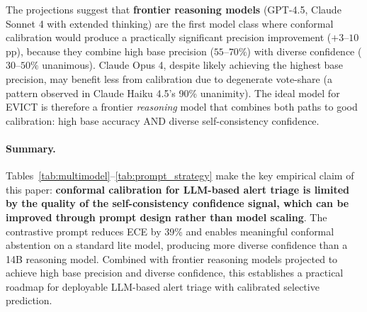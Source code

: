 The projections suggest that \textbf{frontier reasoning models} (GPT-4.5, Claude Sonnet 4 with extended thinking) are the first model class where conformal calibration would produce a practically significant precision improvement ($+3$--$10$pp), because they combine high base precision ($55$--$70\%$) with diverse confidence ($30$--$50\%$ unanimous). Claude Opus 4, despite likely achieving the highest base precision, may benefit less from calibration due to degenerate vote-share (a pattern observed in Claude Haiku 4.5's 90\% unanimity). The ideal model for EVICT is therefore a frontier \emph{reasoning} model that combines both paths to good calibration: high base accuracy AND diverse self-consistency confidence.

\paragraph{Summary.}
Tables~\ref{tab:multimodel}--\ref{tab:prompt_strategy} make the key empirical claim of this paper: \textbf{conformal calibration for LLM-based alert triage is limited by the quality of the self-consistency confidence signal, which can be improved through prompt design rather than model scaling}. The contrastive prompt reduces ECE by 39\% and enables meaningful conformal abstention on a standard lite model, producing more diverse confidence than a 14B reasoning model. Combined with frontier reasoning models projected to achieve high base precision and diverse confidence, this establishes a practical roadmap for deployable LLM-based alert triage with calibrated selective prediction.
